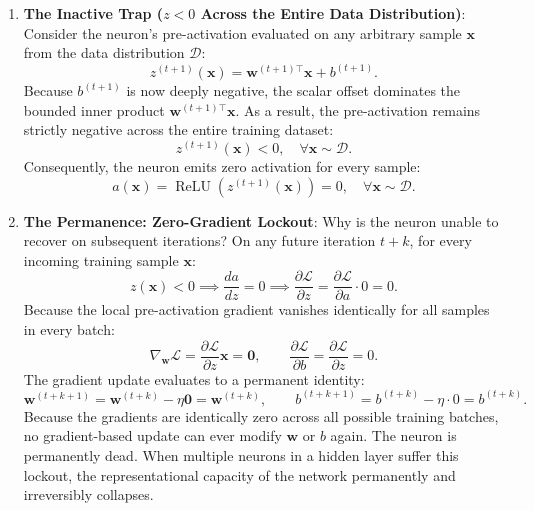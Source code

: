 \begin{enumerate}[leftmargin=*]
  \item \textbf{The Inactive Trap ($z < 0$ Across the Entire Data Distribution)}: Consider the neuron's pre-activation evaluated on any arbitrary sample $\mathbf{x}$ from the data distribution $\mathcal{D}$:
  \begin{equation}
  z^{(t+1)}(\mathbf{x}) = \mathbf{w}^{(t+1)\top} \mathbf{x} + b^{(t+1)}.
  \end{equation}
  Because $b^{(t+1)}$ is now deeply negative, the scalar offset dominates the bounded inner product $\mathbf{w}^{(t+1)\top} \mathbf{x}$. As a result, the pre-activation remains strictly negative across the entire training dataset:
  \begin{equation}
  z^{(t+1)}(\mathbf{x}) < 0, \quad \forall \mathbf{x} \sim \mathcal{D}.
  \end{equation}
  Consequently, the neuron emits zero activation for every sample:
  \begin{equation}
  a(\mathbf{x}) = \operatorname{ReLU}\left( z^{(t+1)}(\mathbf{x}) \right) = 0, \quad \forall \mathbf{x} \sim \mathcal{D}.
  \end{equation}

  \item \textbf{The Permanence: Zero-Gradient Lockout}: Why is the neuron unable to recover on subsequent iterations? On any future iteration $t+k$, for every incoming training sample $\mathbf{x}$:
  \begin{equation}
  z(\mathbf{x}) < 0 \implies \frac{da}{dz} = 0 \implies \frac{\partial \mathcal{L}}{\partial z} = \frac{\partial \mathcal{L}}{\partial a} \cdot 0 = 0.
  \end{equation}
  Because the local pre-activation gradient vanishes identically for all samples in every batch:
  \begin{equation}
  \nabla_\mathbf{w} \mathcal{L} = \frac{\partial \mathcal{L}}{\partial z} \mathbf{x} = \mathbf{0}, \qquad \frac{\partial \mathcal{L}}{\partial b} = \frac{\partial \mathcal{L}}{\partial z} = 0.
  \end{equation}
  The gradient update evaluates to a permanent identity:
  \begin{equation}
  \mathbf{w}^{(t+k+1)} = \mathbf{w}^{(t+k)} - \eta \mathbf{0} = \mathbf{w}^{(t+k)}, \qquad b^{(t+k+1)} = b^{(t+k)} - \eta \cdot 0 = b^{(t+k)}.
  \end{equation}
  Because the gradients are identically zero across all possible training batches, no gradient-based update can ever modify $\mathbf{w}$ or $b$ again. The neuron is permanently dead. When multiple neurons in a hidden layer suffer this lockout, the representational capacity of the network permanently and irreversibly collapses.
\end{enumerate}


